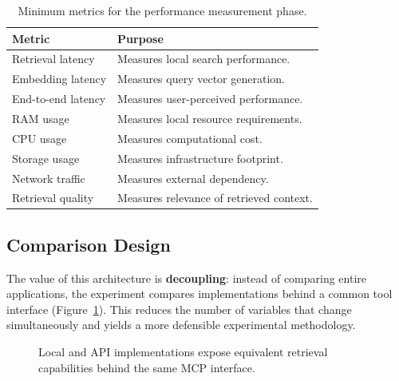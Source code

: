 \documentclass[11pt,a4paper]{article}
\begin{document}
\begin{table}[htbp]
\centering
\begingroup
\footnotesize
\setlength{\tabcolsep}{4pt}
\begin{tabular}{>{\raggedright\arraybackslash}p{4.6cm}>{\raggedright\arraybackslash}p{10.4cm}}
\toprule
\textbf{Metric} & \textbf{Purpose} \\
\midrule
Retrieval latency & Measures local search performance. \\
Embedding latency & Measures query vector generation. \\
End-to-end latency & Measures user-perceived performance. \\
RAM usage & Measures local resource requirements. \\
CPU usage & Measures computational cost. \\
Storage usage & Measures infrastructure footprint. \\
Network traffic & Measures external dependency. \\
Retrieval quality & Measures relevance of retrieved context. \\
\bottomrule
\end{tabular}
\endgroup
\caption{Minimum metrics for the performance measurement phase.}
\label{tab:metrics}
\end{table}

\subsection{Comparison Design}

The value of this architecture is \textbf{decoupling}: instead of comparing
entire applications, the experiment compares implementations behind a common
tool interface (Figure~\ref{fig:comparison}). This reduces the number of
variables that change simultaneously and yields a more defensible
experimental methodology.

\begin{figure}[htbp]
\centering
{}
\caption{Local and API implementations expose equivalent retrieval capabilities behind the same MCP interface.}
\label{fig:comparison}
\end{figure}
\end{document}
